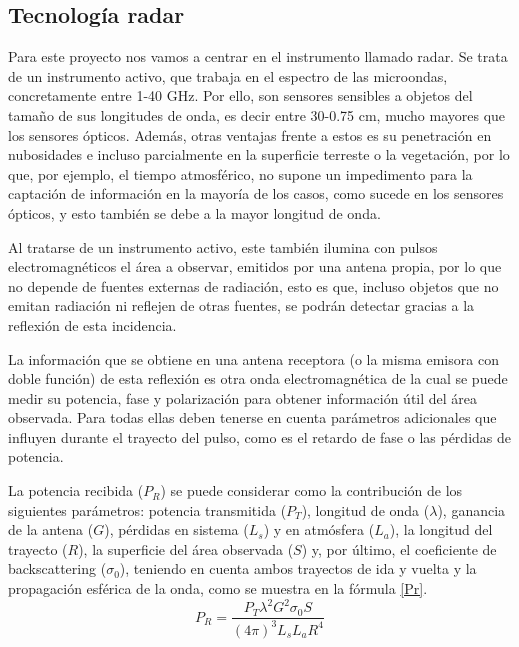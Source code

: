 \subsection{Tecnología radar}
\par Para este proyecto nos vamos a centrar en el instrumento llamado radar. Se trata de un instrumento activo, que trabaja en el espectro de las microondas, concretamente entre 1-40 GHz. Por ello, son sensores sensibles a objetos del tamaño de sus longitudes de onda, es decir entre 30-0.75 cm, mucho mayores que los sensores ópticos. Además, otras ventajas frente a estos es su penetración en nubosidades e incluso parcialmente en la superficie terreste o la vegetación, por lo que, por ejemplo, el tiempo atmosférico, no supone un impedimento para la captación de información en la mayoría de los casos, como sucede en los sensores ópticos, y esto también se debe a la mayor longitud de onda.
\\
\par Al tratarse de un instrumento activo, este también ilumina con pulsos electromagnéticos el área a observar, emitidos por una antena propia, por lo que no depende de fuentes externas de radiación, esto es que, incluso objetos que no emitan radiación ni reflejen de otras fuentes, se podrán detectar gracias a la reflexión de esta incidencia. 
\\ 
\par La información que se obtiene en una antena receptora (o la misma emisora con doble función) de esta reflexión es otra onda electromagnética de la cual se puede medir su potencia, fase y polarización para obtener información útil del área observada. Para todas ellas deben tenerse en cuenta parámetros adicionales que influyen durante el trayecto del pulso, como es el retardo de fase o las pérdidas de potencia. 
\\
\par La potencia recibida ($P_{R}$) se puede considerar como la contribución de los siguientes parámetros: potencia transmitida ($P_{T}$), longitud de onda ($\lambda$), ganancia de la antena ($G$), pérdidas en sistema ($L_{s}$) y en atmósfera ($L_{a}$), la longitud del trayecto ($R$), la superficie del área observada ($S$) y, por último, el coeficiente de backscattering ($\sigma_{0}$), teniendo en cuenta ambos trayectos de ida y vuelta y la propagación esférica de la onda, como se muestra en la fórmula \ref{Pr}. 
\\
\begin{equation} \label{Pr}
P_{R}=\frac{P_{T}\lambda ^{2}G^{2}\sigma_{0}S}{(4\pi ) ^{3}L_{s}L_{a}R^{4}}
\end{equation}
